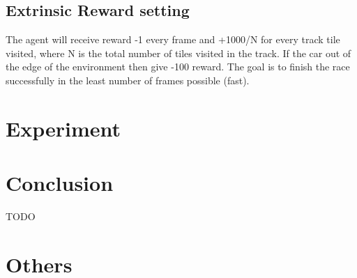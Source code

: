 \documentclass{article}
\begin{document}
\subsection{Extrinsic Reward setting}
The agent will receive reward -1 every frame and +1000/N
for every track tile visited, where N is the total number of tiles
visited in the track. If the car out of the edge of the environment then give -100 reward. The goal is to finish the race successfully in the least number of frames possible (fast). 

\section{Experiment}

\section{Conclusion}
TODO
\section{Others}



\end{document}
